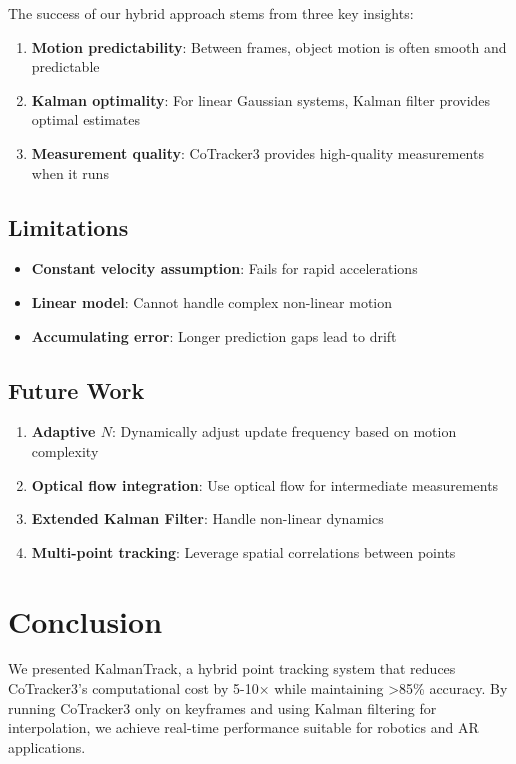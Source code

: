 \documentclass[11pt]{article}
\begin{document}
The success of our hybrid approach stems from three key insights:

\begin{enumerate}
    \item \textbf{Motion predictability}: Between frames, object motion is often smooth and predictable
    \item \textbf{Kalman optimality}: For linear Gaussian systems, Kalman filter provides optimal estimates
    \item \textbf{Measurement quality}: CoTracker3 provides high-quality measurements when it runs
\end{enumerate}

\subsection{Limitations}

\begin{itemize}
    \item \textbf{Constant velocity assumption}: Fails for rapid accelerations
    \item \textbf{Linear model}: Cannot handle complex non-linear motion
    \item \textbf{Accumulating error}: Longer prediction gaps lead to drift
\end{itemize}

\subsection{Future Work}

\begin{enumerate}
    \item \textbf{Adaptive $N$}: Dynamically adjust update frequency based on motion complexity
    \item \textbf{Optical flow integration}: Use optical flow for intermediate measurements
    \item \textbf{Extended Kalman Filter}: Handle non-linear dynamics
    \item \textbf{Multi-point tracking}: Leverage spatial correlations between points
\end{enumerate}

\section{Conclusion}

We presented KalmanTrack, a hybrid point tracking system that reduces CoTracker3's computational cost by 5-10× while maintaining >85\% accuracy. By running CoTracker3 only on keyframes and using Kalman filtering for interpolation, we achieve real-time performance suitable for robotics and AR applications.
\end{document}

